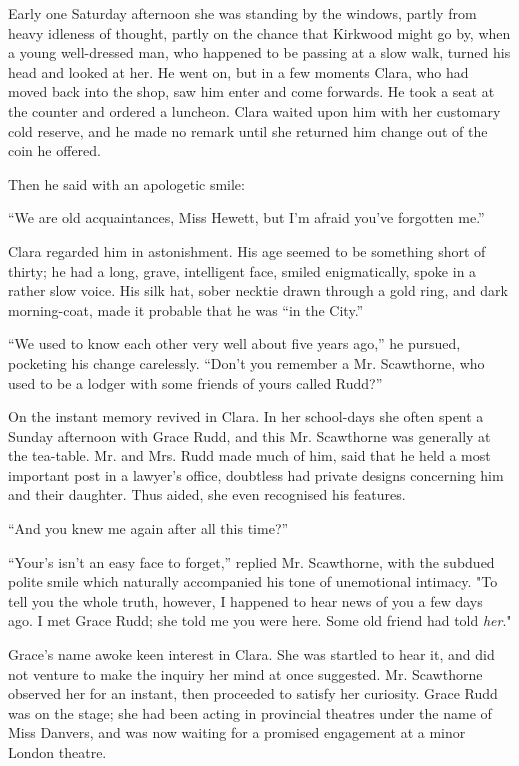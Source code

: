 Early one Saturday afternoon she was standing by the windows, partly
from heavy idleness of thought, partly on the chance that Kirkwood might
go by, when a young well-dressed man, who happened to be passing at a
slow walk, turned his head and looked at her. He went on, but in a few
moments Clara, who had moved back into the shop, saw him enter and come
forwards. He took a seat at the counter and ordered a luncheon. Clara
waited upon him with her customary cold reserve, and he made no remark
until she returned him change out of the coin he offered.

{}Then he said with an apologetic smile:

``We are old acquaintances, Miss Hewett, but I'm afraid you've forgotten
me.''

Clara regarded him in astonishment. His age seemed to be something short
of thirty; he had a long, grave, intelligent face, smiled enigmatically,
spoke in a rather slow voice. His silk hat, sober necktie drawn through
a gold ring, and dark morning-coat, made it probable that he was ``in
the City.''

``We used to know each other very well about five years ago,'' he
pursued, pocketing his change carelessly. ``Don't you remember a Mr.
Scawthorne, who used to be a lodger with some friends of yours called
Rudd?''

On the instant memory revived in Clara. In her school-days she often
spent a Sunday afternoon with Grace Rudd, and this Mr. Scawthorne was
generally at the tea-table. Mr. and Mrs. Rudd made much of him, said
that he held a most important post in a lawyer's office, doubtless had
private designs concerning him and their daughter. Thus aided, she even
recognised his features.

{}``And you knew me again after all this time?''

``Your's isn't an easy face to forget,'' replied Mr. Scawthorne, with
the subdued polite smile which naturally accompanied his tone of
unemotional intimacy. "To tell you the whole truth, however, I happened
to hear news of you a few days ago. I met Grace Rudd; she told me you
were here. Some old friend had told \emph{her}."

Grace's name awoke keen interest in Clara. She was startled to hear it,
and did not venture to make the inquiry her mind at once suggested. Mr.
Scawthorne observed her for an instant, then proceeded to satisfy her
curiosity. Grace Rudd was on the stage; she had been acting in
provincial theatres under the name of Miss Danvers, and was now waiting
for a promised engagement at a minor London theatre.

